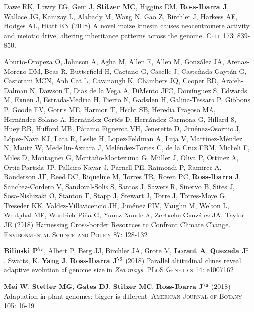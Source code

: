 \documentclass[letterpaper,10pt]{article}
\begin{document}
\begin{etaremune}
\item Dawe RK, Lowry EG, Gent J, \textbf{Stitzer MC}, Higgins DM, \textbf{Ross-Ibarra J}, Wallace JG, Kanizay L, Alabady M, Wang N, Gao Z, Birchler J, Harkess AE, Hodges AL, Hiatt EN (2018) A novel maize kinesin causes neocentromere activity and meiotic drive, altering inheritance patterns across the genome. \textsc{Cell} 173: 839-850.

\item  Aburto-Oropeza O, Johnson A, Agha M, Allen E,  Allen M,  Gonz\'{a}lez JA, Arenas-Moreno DM, Beas R, Butterfield H, Caetano G, Caselle J, Caste\~{n}ada Gayt\'{a}n G, Castorani MCN, Anh Cat L, Cavanaugh K, Chambers JQ, Cooper RD, Arafeh-Dalmau N, Dawson T, Diaz de la Vega A, DiMento JFC, Dom\'{i}nguez S, Edwards M, Ennen J, Estrada-Medina H, Fierro N, Gadsden H, Galina-Tessaro P, Gibbons P, Goode EV, Gorris ME, Harmon T, Hecht SB, Heredia Fragoso MA, Hern\'{a}ndez-Solano A, Hern\'{a}ndez-Cort\'{e}s D, Hern\'{a}ndez-Carmona G, Hillard S, Huey RB, Hufford MB, P\`{a}ramo Figueroa VH, Jenerette D, Jim\'{e}nez-Osornio J, L\'{o}pez-Nava KJ, Lara R, Leslie H, Lopez-Feldman A, Luja V, Mart\'{i}nez-M\'{e}ndez N, Mautz W, Medellin-Azuara J, Mel\'{e}ndez-Torres C, de la Cruz FRM,  Micheli F, Miles D, Montagner G, Monta\~{n}o-Moctezuma G, M\"{u}ller J, Oliva P, Ortinez A, Ortiz Partida JP, Palleiro-Nayar J, Parnell PE, Raimondi P, Ramirez A, Randerson JT, Reed DC, Riquelme M, Torres TR, Rosen PC, {\bf Ross-Ibarra J}, Sanchez-Cordero V, Sandoval-Solis S, Santos J, Sawers R, Sinervo B, Sites J,  Sosa-Nishizaki O, Stanton T, Stapp J, Stewart J, Torre J,  Torres-Moye G, Treseder KK, Valdez-Villavicencio JH, Jim\'{e}nez FIV, Vaughn M, Welton L, Westphal MF, Woolrich-Pi\~{n}a G,  Yunez-Naude A, Zertuche-Gonz\'{a}lez JA, Taylor JE (2018)
Harnessing Cross-border Resources to Confront Climate Change.  \textsc{Environmental Science and Policy}  87: 128-132.

\item \textbf{Bilinski P}$^\S$, Albert P, Berg JJ, Birchler JA, Grote M, \textbf{Lorant A}, \textbf{Quezada J}$^\ddagger$, Swarts, K, \textbf{Yang J}, \textbf{Ross-Ibarra J}$^\S$ (2018) Parallel altitudinal clines reveal adaptive evolution of genome size in \textit{Zea mays}. \textsc{PLoS Genetics} 14: e1007162

\item {\bf Mei W}, {\bf Stetter MG}, {\bf Gates DJ}, {\bf Stitzer MC}, {\bf Ross-Ibarra J}$^\S$ (2018) Adaptation in plant genomes: bigger is different.  \textsc{American Journal of Botany} 105: 16-19


\end{etaremune}
\end{document}

